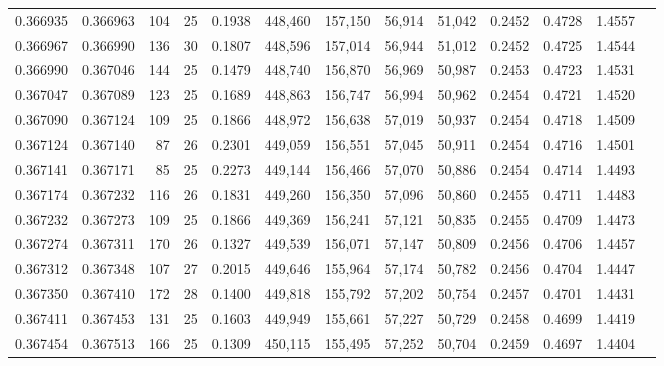 \begin{tabular}{rrrrrrrrrrrrr}
0.366935 & 0.366963 &   104 &  25 &                                     0.1938 & 448,460 & 157,150 &  56,914 &  51,042 & 0.2452 & 0.4728 & 1.4557 \\
0.366967 & 0.366990 &   136 &  30 &                                     0.1807 & 448,596 & 157,014 &  56,944 &  51,012 & 0.2452 & 0.4725 & 1.4544 \\
0.366990 & 0.367046 &   144 &  25 &                                     0.1479 & 448,740 & 156,870 &  56,969 &  50,987 & 0.2453 & 0.4723 & 1.4531 \\
0.367047 & 0.367089 &   123 &  25 &                                     0.1689 & 448,863 & 156,747 &  56,994 &  50,962 & 0.2454 & 0.4721 & 1.4520 \\
0.367090 & 0.367124 &   109 &  25 &                                     0.1866 & 448,972 & 156,638 &  57,019 &  50,937 & 0.2454 & 0.4718 & 1.4509 \\
0.367124 & 0.367140 &    87 &  26 &                                     0.2301 & 449,059 & 156,551 &  57,045 &  50,911 & 0.2454 & 0.4716 & 1.4501 \\
0.367141 & 0.367171 &    85 &  25 &                                     0.2273 & 449,144 & 156,466 &  57,070 &  50,886 & 0.2454 & 0.4714 & 1.4493 \\
0.367174 & 0.367232 &   116 &  26 &                                     0.1831 & 449,260 & 156,350 &  57,096 &  50,860 & 0.2455 & 0.4711 & 1.4483 \\
0.367232 & 0.367273 &   109 &  25 &                                     0.1866 & 449,369 & 156,241 &  57,121 &  50,835 & 0.2455 & 0.4709 & 1.4473 \\
0.367274 & 0.367311 &   170 &  26 &                                     0.1327 & 449,539 & 156,071 &  57,147 &  50,809 & 0.2456 & 0.4706 & 1.4457 \\
0.367312 & 0.367348 &   107 &  27 &                                     0.2015 & 449,646 & 155,964 &  57,174 &  50,782 & 0.2456 & 0.4704 & 1.4447 \\
0.367350 & 0.367410 &   172 &  28 &                                     0.1400 & 449,818 & 155,792 &  57,202 &  50,754 & 0.2457 & 0.4701 & 1.4431 \\
0.367411 & 0.367453 &   131 &  25 &                                     0.1603 & 449,949 & 155,661 &  57,227 &  50,729 & 0.2458 & 0.4699 & 1.4419 \\
0.367454 & 0.367513 &   166 &  25 &                                     0.1309 & 450,115 & 155,495 &  57,252 &  50,704 & 0.2459 & 0.4697 & 1.4404 \\

\end{tabular}
